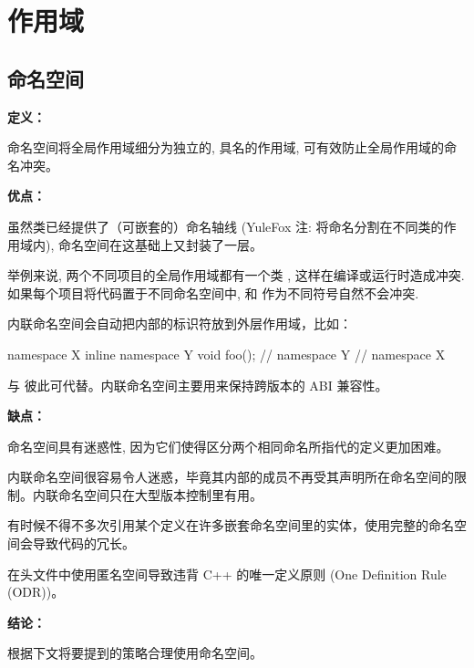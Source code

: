 \chapter{作用域}

\section{命名空间} \label{namespace}


\textbf{定义：}

命名空间将全局作用域细分为独立的, 具名的作用域, 可有效防止全局作用域的命名冲突。

\textbf{优点：}

虽然类已经提供了（可嵌套的）命名轴线 (YuleFox 注: 将命名分割在不同类的作用域内), 命名空间在这基础上又封装了一层。

举例来说, 两个不同项目的全局作用域都有一个类 , 这样在编译或运行时造成冲突. 如果每个项目将代码置于不同命名空间中,
 和  作为不同符号自然不会冲突.

内联命名空间会自动把内部的标识符放到外层作用域，比如：

\begin{cppcode}
namespace X {
inline namespace Y {
  void foo();
}  // namespace Y
}  // namespace X
\end{cppcode}

 与  彼此可代替。内联命名空间主要用来保持跨版本的 ABI 兼容性。

\textbf{缺点：}

命名空间具有迷惑性, 因为它们使得区分两个相同命名所指代的定义更加困难。

内联命名空间很容易令人迷惑，毕竟其内部的成员不再受其声明所在命名空间的限制。内联命名空间只在大型版本控制里有用。

有时候不得不多次引用某个定义在许多嵌套命名空间里的实体，使用完整的命名空间会导致代码的冗长。

在头文件中使用匿名空间导致违背 C++ 的唯一定义原则 (One Definition Rule (ODR))。

\textbf{结论：}

根据下文将要提到的策略合理使用命名空间。


